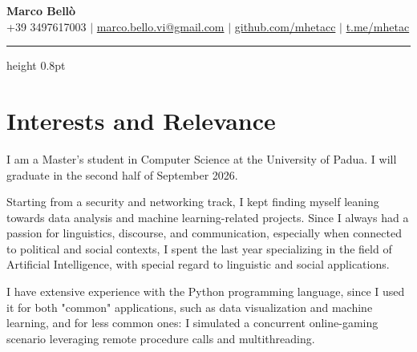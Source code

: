 \documentclass[12pt,a4paper,sans]{moderncv} %
\begin{document}
\begin{center}
    \textbf{\Huge Marco Bellò} \\ \vspace{5pt}
    \small \faMobile* +39 3497617003 \hspace{1pt} $|$
    \hspace{1pt} \faEnvelope \hspace{2pt} \href{mailto:marco.bello.vi@gmail.com}{marco.bello.vi@gmail.com} \hspace{1pt} $|$ 
    \hspace{1pt} \faGithub \hspace{2pt} \href{https://github.com/mhetacc}{github.com/mhetacc} \hspace{1pt} $|$
    \hspace{1pt} \faTelegram \hspace{2pt} \href{https://t.me/mhetac}{t.me/mhetac}
    \\ \vspace{-3pt}
\end{center}
\vspace{10pt} %

{\color{venetianred} \hrule height 0.8pt}

\vspace{10pt}
\section{Interests and Relevance}

I am a Master's student in Computer Science at the University of Padua. I will graduate in the second half of September 2026.

Starting from a security and networking track, I kept finding myself leaning towards data analysis and machine learning-related projects. Since I always had a passion for linguistics, discourse, and communication, especially when connected to political and social contexts, I spent the last year specializing in the field of Artificial Intelligence, with special regard to linguistic and social applications. 

\vspace{2mm}

I have extensive experience with the Python programming language, since I used it for both "common" applications, such as data visualization and machine learning, and for less common ones: I simulated a concurrent online-gaming scenario leveraging remote procedure calls and multithreading.
\end{document}
